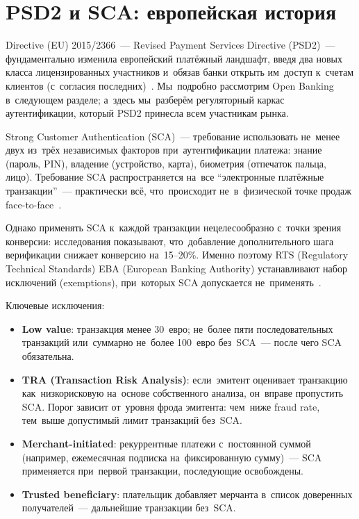 \section{PSD2 и SCA: европейская история}
\label{sec:psd2-sca}

Directive (EU) 2015/2366~--- Revised Payment Services Directive (PSD2)~---
фундаментально изменила европейский платёжный ландшафт, введя два новых
класса лицензированных участников и~обязав банки открыть им~доступ
к~счетам клиентов (с~согласия последних)~. Мы~подробно
рассмотрим Open Banking в~следующем разделе; а~здесь мы~разберём регуляторный
каркас аутентификации, который PSD2 принесла всем участникам рынка.

Strong Customer Authentication (SCA)~--- требование использовать
не~менее двух из~трёх независимых факторов при~аутентификации платежа:
знание (пароль, PIN), владение (устройство, карта), биометрия
(отпечаток пальца, лицо). Требование SCA распространяется на~все
\enquote{электронные платёжные транзакции}~--- практически всё,
что~происходит не~в~физической точке продаж face-to-face~.

Однако применять SCA к~каждой транзакции нецелесообразно с~точки
зрения конверсии: исследования показывают, что~добавление дополнительного
шага верификации снижает конверсию на~15--20\%. Именно поэтому
RTS (Regulatory Technical Standards) EBA (European Banking Authority)
устанавливают набор исключений (exemptions), при~которых SCA
допускается не~применять~.

Ключевые исключения:
\begin{itemize}
  \item \textbf{Low value}: транзакция менее 30~евро; не~более
        пяти последовательных транзакций или~суммарно не~более 100~евро
        без~SCA~--- после чего SCA обязательна.
  \item \textbf{TRA (Transaction Risk Analysis)}: если~эмитент
        оценивает транзакцию как~низкорисковую на~основе собственного
        анализа, он~вправе пропустить SCA. Порог зависит от~уровня
        фрода эмитента: чем~ниже fraud rate, тем~выше допустимый лимит
        транзакций без~SCA.
  \item \textbf{Merchant-initiated}: рекуррентные платежи с~постоянной
        суммой (например, ежемесячная подписка на~фиксированную сумму)~---
        SCA применяется при~первой транзакции, последующие освобождены.
  \item \textbf{Trusted beneficiary}: плательщик добавляет мерчанта
        в~список доверенных получателей~--- дальнейшие транзакции
        без~SCA.
\end{itemize}

